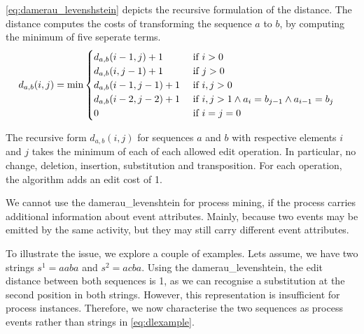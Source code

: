 \documentclass[./../../paper.tex]{subfiles}
\begin{document}
\noindent \autoref{eq:damerau_levenshstein} depicts the recursive formulation of the distance. The distance computes the costs of transforming the sequence $a$ to $b$, by computing the minimum of five seperate terms. %
\begin{align}
    \label{eq:damerau_levenshstein}
    d_{a, b}(i, j) & =\min
    \begin{cases}
        d_{a, b}(i-1, j  )+ 1 & \text { if } i>0                                            \\
        d_{a, b}(i  , j-1)+ 1 & \text { if } j>0                                            \\
        d_{a, b}(i-1, j-1)+ 1 & \text { if } i, j>0                                         \\
        d_{a, b}(i-2, j-2)+ 1 & \text { if } i, j>1 \land a_{i}=b_{j-1} \land a_{i-1}=b_{j} \\
        0                                 & \text { if } i=j=0                                         
    \end{cases}        
\end{align}

\noindent The recursive form $d_{a, b}(i, j)$ for sequences $a$ and $b$ with respective elements $i$ and $j$ takes the minimum of each of each allowed edit operation. In particular, no change, deletion, insertion, substitution and transposition. For each operation, the algorithm adds an edit cost of 1. 

We cannot use the \gls{damerau_levenshtein} for process mining, if the process carries additional information about event attributes. Mainly, because two events may be emitted by the same activity, but they may still carry different event attributes. 

To illustrate the issue, we explore a couple of examples. Lets assume, we have two strings $s^1=aaba$ and $s^2=acba$. Using the \gls{damerau_levenshtein}, the edit distance between both sequences is 1, as we can recognise a substitution at the second position in both strings. However, this representation is insufficient for process instances. Therefore, we now characterise the two sequences as process events rather than strings in \autoref{eq:dlexample}. 
\end{document}

